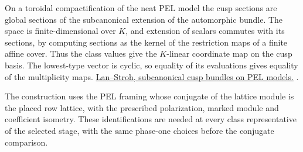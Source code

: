 On a toroidal compactification of the neat PEL model the
cusp sections are global sections of the subcanonical
extension of the automorphic bundle. The space is
finite-dimensional over \(K\), and extension of
scalars commutes with its sections, by computing
sections as the kernel of the restriction maps of
a finite affine cover. Thus the class values give
the \(K\)-linear coordinate map on the cusp basis.
The lowest-type vector is cyclic, so equality of
its evaluations gives equality of the multiplicity maps.
\href{https://msp.org/ant/2014/8-8/ant-v8-n8-p01-s.pdf}{Lan--Stroh, subcanonical cusp bundles on PEL models.}
.

The construction uses the PEL framing whose conjugate
of the lattice module is the placed row lattice,
with the prescribed polarization, marked module
and coefficient isometry. These identifications are
needed at every class representative of the selected
stage, with the same phase-one choices before the
conjugate comparison.

